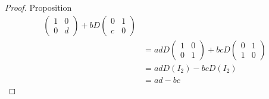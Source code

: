 \begin{proof} {Proposition}
\begin{align*}
\begin{pmatrix}
            1 & 0 \\
            0 & d
            \end{pmatrix} + bD\begin{pmatrix}
            0 & 1 \\
            c & 0
            \end{pmatrix} \\
            &= adD\begin{pmatrix}
            1 & 0 \\
            0 & 1
            \end{pmatrix} + bcD\begin{pmatrix}
            0 & 1 \\
            1 & 0
            \end{pmatrix} \\
            &= adD(I_2) - bcD(I_2) \\
            &= ad-bc
    \end{align*}
\end{proof}
